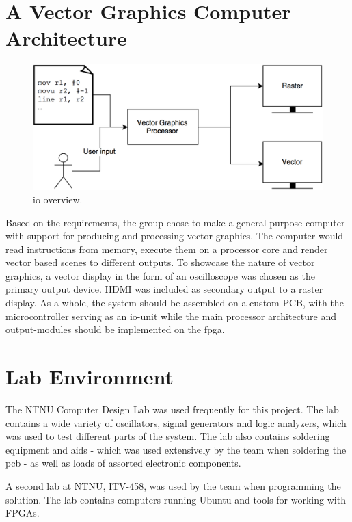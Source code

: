 \section{A Vector Graphics Computer Architecture}

\begin{figure}[H]
    \includegraphics[width=\linewidth]{images/high_level_io.png}
    \caption{\gls{io} overview.}
    \label{fig:io-overview}
\end{figure}

Based on the requirements, the group chose to make a general purpose computer with support for producing and processing vector graphics.
The computer would read instructions from memory, execute them on a processor core and render vector based scenes to different outputs.
To showcase the nature of vector graphics, a vector display in the form of an oscilloscope was chosen as the primary output device.
HDMI was included as secondary output to a raster display.
As a whole, the system should be assembled on a custom PCB, with the microcontroller serving as an \gls{io}-unit while the main processor architecture and output-modules should be implemented on the \gls{fpga}.

\section{Lab Environment}
The NTNU Computer Design Lab was used frequently for this project.
The lab contains a wide variety of oscillators, signal generators and logic analyzers, which was used to test different parts of the system.
The lab also contains soldering equipment and aids - which was used extensively by the team when soldering the \gls{pcb} - as well as loads of assorted electronic components.

A second lab at NTNU, ITV-458, was used by the team when programming the solution.
The lab contains computers running Ubuntu and tools for working with FPGAs.

